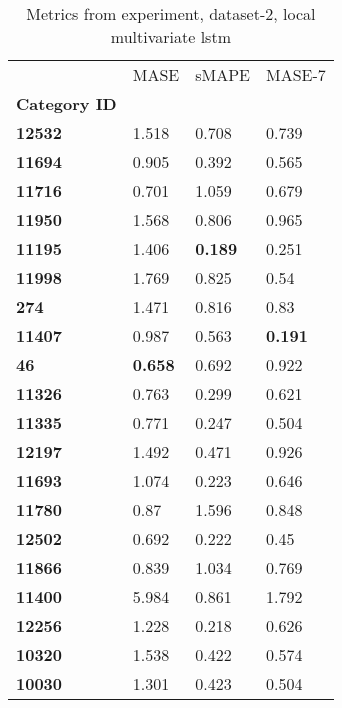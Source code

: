 \begin{table}[H]
\centering
\caption{Metrics from experiment, dataset-2, local multivariate lstm}
\label{table:local-multivariate-lstm-dataset-2}
\begin{tabular}{llll}
\toprule
{} &            MASE &           sMAPE &          MASE-7 \\
\textbf{Category ID} &                 &                 &                 \\
\midrule
\textbf{12532      } &           1.518 &           0.708 &           0.739 \\
\textbf{11694      } &           0.905 &           0.392 &           0.565 \\
\textbf{11716      } &           0.701 &           1.059 &           0.679 \\
\textbf{11950      } &           1.568 &           0.806 &           0.965 \\
\textbf{11195      } &           1.406 &  \textbf{0.189} &           0.251 \\
\textbf{11998      } &           1.769 &           0.825 &            0.54 \\
\textbf{274        } &           1.471 &           0.816 &            0.83 \\
\textbf{11407      } &           0.987 &           0.563 &  \textbf{0.191} \\
\textbf{46         } &  \textbf{0.658} &           0.692 &           0.922 \\
\textbf{11326      } &           0.763 &           0.299 &           0.621 \\
\textbf{11335      } &           0.771 &           0.247 &           0.504 \\
\textbf{12197      } &           1.492 &           0.471 &           0.926 \\
\textbf{11693      } &           1.074 &           0.223 &           0.646 \\
\textbf{11780      } &            0.87 &           1.596 &           0.848 \\
\textbf{12502      } &           0.692 &           0.222 &            0.45 \\
\textbf{11866      } &           0.839 &           1.034 &           0.769 \\
\textbf{11400      } &           5.984 &           0.861 &           1.792 \\
\textbf{12256      } &           1.228 &           0.218 &           0.626 \\
\textbf{10320      } &           1.538 &           0.422 &           0.574 \\
\textbf{10030      } &           1.301 &           0.423 &           0.504 \\
\bottomrule
\end{tabular}
\end{table}
